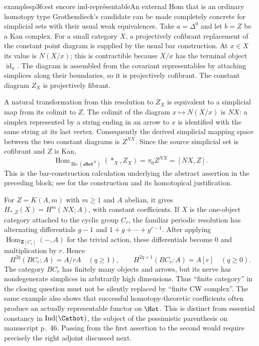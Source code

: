 \begin{dcomment}{examples}{p36:est encore ind-représentable}{An external Hom that is an ordinary homotopy type}
Grothendieck's candidate can be made completely concrete for simplicial sets with their usual weak equivalences. Take $a=\Delta^0$ and let $b=Z$ be a Kan complex. For a small category $X$, a projectively cofibrant replacement of the constant point diagram is supplied by the usual bar construction. At $x\in X$ its value is $N(X/x)$; this is contractible because $X/x$ has the terminal object $\operatorname{id}_x$. The diagram is assembled from the covariant representables by attaching simplices along their boundaries, so it is projectively cofibrant. The constant diagram $Z_X$ is projectively fibrant.

A natural transformation from this resolution to $Z_X$ is equivalent to a simplicial map from its colimit to $Z$. The colimit of the diagram $x\mapsto N(X/x)$ is $NX$: a simplex represented by a string ending in an arrow to $x$ is identified with the same string at its last vertex. Consequently the derived simplicial mapping space between the two constant diagrams is $Z^{NX}$. Since the source simplicial set is cofibrant and $Z$ is Kan,
\[
 \operatorname{Hom}_{\operatorname{Ho}(\mathbf{sSet}^{X})}
       (*_X,Z_X)=\pi_0 Z^{NX}=[NX,Z].
\]
This is the bar-construction calculation underlying the abstract assertion in the preceding block; see \citet[\S\S4.4--4.5 and 5.1]{Riehl2014} for the construction and its homotopical justification.

For $Z=K(A,m)$ with $m\geq1$ and $A$ abelian, it gives $H_{*,Z}(X)=H^m(NX;A)$, with constant coefficients. If $X$ is the one-object category attached to the cyclic group $C_r$, the familiar periodic resolution has alternating differentials $g-1$ and $1+g+\cdots+g^{r-1}$. After applying $\operatorname{Hom}_{\mathbf Z[C_r]}(-,A)$ for the trivial action, these differentials become $0$ and multiplication by $r$. Hence
\[
 H^{2q}(BC_r;A)=A/rA\quad(q\geq1),\qquad
 H^{2q+1}(BC_r;A)=A[r]\quad(q\geq0).
\]
The category $BC_r$ has finitely many objects and arrows, but its nerve has nondegenerate simplices in arbitrarily high dimensions. Thus ``finite category'' in the closing question must not be silently replaced by ``finite CW complex''. The same example also shows that successful homotopy-theoretic coefficients often produce an actually representable functor on $\Hot$. This is distinct from essential constancy in $\operatorname{Ind}(\Cathot)$, the subject of the pessimistic parenthesis on manuscript p.~46. Passing from the first assertion to the second would require precisely the right adjoint discussed next.
\end{dcomment}

